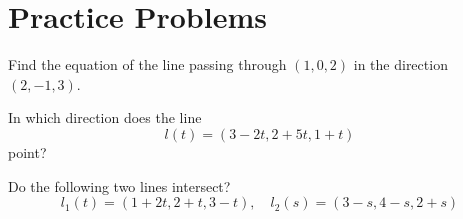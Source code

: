 \documentclass[openany]{book}
\begin{document}
\chapter{Practice Problems}


\begin{prob}
    Find the equation of the line passing through $(1,0,2)$ in the direction $(2,-1,3)$.
\end{prob}

\begin{prob}
    In which direction does the line 
    \begin{equation*}
        l(t)=(3-2t, 2+5t, 1+t)
    \end{equation*}
    point?
\end{prob}


\begin{prob}
    Do the following two lines intersect?
    \begin{equation*}
        l_1(t)=(1+2t, 2+t, 3-t), \quad l_2(s)=(3-s, 4-s, 2+s)
    \end{equation*}
\end{prob}
\end{document}
